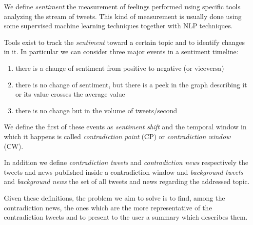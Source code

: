 We define \emph{sentiment} the measurement of feelings performed using specific
tools analyzing the stream of tweets. This kind of measurement is usually done
using some supervised machine learning techniques together with NLP techniques.

Tools exist to track the \emph{sentiment} toward a certain topic and to identify
changes in it. In particular we can consider three major events in a sentiment
timeline:
\begin{enumerate}
	\item there is a change of sentiment from positive to negative (or
		viceversa)
	\item there is no change of sentiment, but there is a peek in the graph
		describing it or its value crosses the average value
	\item there is no change but in the volume of tweets/second
\end{enumerate}
We define the first of these events as \emph{sentiment shift} and the temporal
window in which it happens is called \emph{contradiction point} (CP) or
\emph{contradiction window} (CW).

In addition we define \emph{contradiction tweets} and \emph{contradiction news}
respectively the tweets and news published inside a contradiction window and
\emph{background tweets} and \emph{background news} the set of all tweets and
news regarding the addressed topic.

Given these definitions, the problem we aim to solve is to find, among the
contradiction news, the ones which are the more representative of the
contradiction tweets and to present to the user a summary which describes them.
